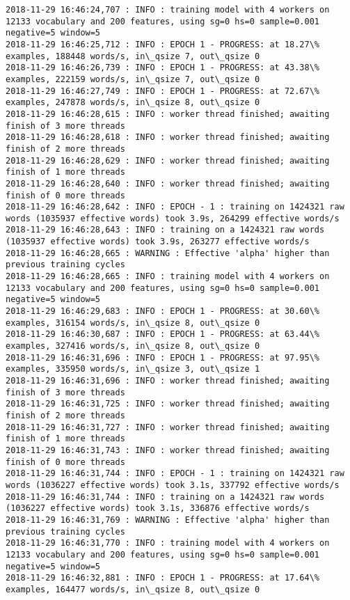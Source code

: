 \documentclass[11pt]{article}
\begin{document}
\begin{Verbatim}[commandchars=\\\{\}]
2018-11-29 16:46:24,707 : INFO : training model with 4 workers on 12133 vocabulary and 200 features, using sg=0 hs=0 sample=0.001 negative=5 window=5
2018-11-29 16:46:25,712 : INFO : EPOCH 1 - PROGRESS: at 18.27\% examples, 188448 words/s, in\_qsize 7, out\_qsize 0
2018-11-29 16:46:26,739 : INFO : EPOCH 1 - PROGRESS: at 43.38\% examples, 222159 words/s, in\_qsize 7, out\_qsize 0
2018-11-29 16:46:27,749 : INFO : EPOCH 1 - PROGRESS: at 72.67\% examples, 247878 words/s, in\_qsize 8, out\_qsize 0
2018-11-29 16:46:28,615 : INFO : worker thread finished; awaiting finish of 3 more threads
2018-11-29 16:46:28,618 : INFO : worker thread finished; awaiting finish of 2 more threads
2018-11-29 16:46:28,629 : INFO : worker thread finished; awaiting finish of 1 more threads
2018-11-29 16:46:28,640 : INFO : worker thread finished; awaiting finish of 0 more threads
2018-11-29 16:46:28,642 : INFO : EPOCH - 1 : training on 1424321 raw words (1035937 effective words) took 3.9s, 264299 effective words/s
2018-11-29 16:46:28,643 : INFO : training on a 1424321 raw words (1035937 effective words) took 3.9s, 263277 effective words/s
2018-11-29 16:46:28,665 : WARNING : Effective 'alpha' higher than previous training cycles
2018-11-29 16:46:28,665 : INFO : training model with 4 workers on 12133 vocabulary and 200 features, using sg=0 hs=0 sample=0.001 negative=5 window=5
2018-11-29 16:46:29,683 : INFO : EPOCH 1 - PROGRESS: at 30.60\% examples, 316154 words/s, in\_qsize 8, out\_qsize 0
2018-11-29 16:46:30,687 : INFO : EPOCH 1 - PROGRESS: at 63.44\% examples, 327416 words/s, in\_qsize 8, out\_qsize 0
2018-11-29 16:46:31,696 : INFO : EPOCH 1 - PROGRESS: at 97.95\% examples, 335950 words/s, in\_qsize 3, out\_qsize 1
2018-11-29 16:46:31,696 : INFO : worker thread finished; awaiting finish of 3 more threads
2018-11-29 16:46:31,725 : INFO : worker thread finished; awaiting finish of 2 more threads
2018-11-29 16:46:31,727 : INFO : worker thread finished; awaiting finish of 1 more threads
2018-11-29 16:46:31,743 : INFO : worker thread finished; awaiting finish of 0 more threads
2018-11-29 16:46:31,744 : INFO : EPOCH - 1 : training on 1424321 raw words (1036227 effective words) took 3.1s, 337792 effective words/s
2018-11-29 16:46:31,744 : INFO : training on a 1424321 raw words (1036227 effective words) took 3.1s, 336876 effective words/s
2018-11-29 16:46:31,769 : WARNING : Effective 'alpha' higher than previous training cycles
2018-11-29 16:46:31,770 : INFO : training model with 4 workers on 12133 vocabulary and 200 features, using sg=0 hs=0 sample=0.001 negative=5 window=5
2018-11-29 16:46:32,881 : INFO : EPOCH 1 - PROGRESS: at 17.64\% examples, 164477 words/s, in\_qsize 8, out\_qsize 0

\end{Verbatim}
\end{document}
